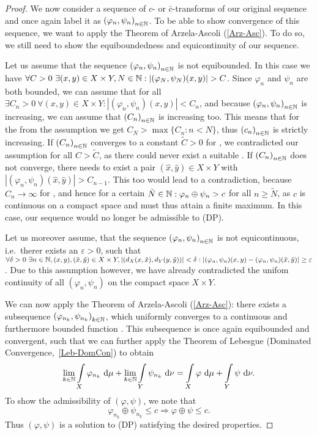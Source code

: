 \begin{proof}
	We now consider a sequence of $c$- or $\bar{c}$-transforms of our original sequence and once again label it as ${(\varphi_n, \psi_n)}_{\NinN}$. To be able to show convergence of this sequence, we want to apply the Theorem of Arzela-Ascoli (\ref{Arz-Asc}). To do so, we still need to show the equiboundedness and equicontinuity of our sequence.
	
	Let us assume that the sequence ${(\varphi_n, \psi_n)}_{\NinN}$ is not equibounded. In this case we have $\forall C > 0~\exists (x, y) \in X \times Y, \NinN[N]: |(\varphi_N, \psi_N)(x, y)| > C$. Since $\varphi_n$ and $\psi_n$ are both bounded, we can assume that  for all \NinN{} $\exists C_n > 0~\forall (x, y) \in X \times Y: |(\varphi_n, \psi_n)(x, y)| < C_n$, and because ${(\varphi_n, \psi_n)}_{\NinN}$ is increasing, we can assume that ${(C_n)}_{\NinN}$ is increasing too. This means that for the \NinN[N] from the assumption we get $C_N > \max \{C_n : n < N \}$, thus ${(c_n)}_{\NinN}$ is strictly increasing. If ${(C_n)}_{\NinN}$ converges to a constant $\tilde{C} > 0$ for \Ninf{}, we contradicted our assumption for all $C > \tilde{C}$, as there could never exist a suitable \NinN. If ${(C_n)}_{\NinN}$ does not converge, there needs to exist a pair $(\hat{x}, \hat{y}) \in X \times Y$ with $|(\varphi_n, \psi_n)(\hat{x}, \hat{y})| > C_{n - 1}$. This too would lead to a contradiction, because $C_n \rightarrow \infty$ for \Ninf{}, and hence for a certain $\NinN[\tilde{N}]: \varphi_n \oplus \psi_n > c$ for all $n \ge \tilde{N}$, as $c$ is continuous on a compact space and must thus attain a finite maximum. In this case, our sequence would no longer be admissible to (DP).
	
	Let us moreover assume, that the sequence ${(\varphi_n, \psi_n)}_{\NinN}$ is not equicontinuous, i.e.\ therer exists an $\varepsilon > 0$, such that $\forall \delta > 0~\exists \NinN, (x, y), (\hat{x}, \hat{y}) \in X \times Y,|(d_X(x, \hat{x}), d_Y(y, \hat{y}))|< \delta: |(\varphi_n, \psi_n)(x, y) - (\varphi_n, \psi_n)(\hat{x}, \hat{y})| \ge \varepsilon$. Due to this assumption however, we have already contradicted the unifom continuity of all $(\varphi_n, \psi_n)$ on the compact space $X \times Y$.
	
	We can now apply the Theorem of Arzela-Ascoli (\ref{Arz-Asc}): there exists a subsequence ${(\varphi_{n_k}, \psi_{n_k})}_{\NinN[k]}$, which uniformly converges to a continuous and furthermore bounded function . This subsequence is once again equibounded and convergent, such that we can further apply the Theorem of Lebesgue (Dominated Convergence,\ \ref{Leb-DomCon}) to obtain
	\[ \lim\limits_{\NinN[k]} \int\limits_X \varphi_{n_k}~\D + \lim\limits_{\NinN[k]} \int\limits_Y \psi_{n_k}~\D[\nu] = \int\limits_X \varphi~\D + \int\limits_Y \psi~\D[\nu]. \]
	To show the admissibility of $(\varphi, \psi)$, we note that
	\[ \varphi_{n_k} \oplus \psi_{n_k} \le c \Rightarrow \varphi \oplus \psi \le c. \]
	Thus $(\varphi, \psi)$ is a solution to (DP) satisfying the desired properties.
\end{proof}

